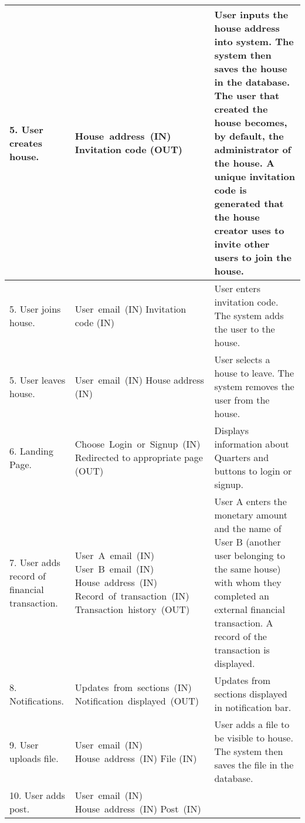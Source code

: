 \documentclass[12pt]{article}
\begin{document}
\begin{longtable}{|p{5cm}|p{5cm}|p{5cm}|}
\hline
5. User creates house. & \mbox{House address (IN)} \linebreak Invitation code (OUT) & User 
inputs the house address into system. The system then saves the house in the 
database. The user that created the house becomes, by default, the administrator of the house. A unique invitation code is generated that the house creator uses to invite other users to join the house. \\
\hline
5. User joins house. & \mbox{User email (IN)} \linebreak Invitation code (IN) & User 
enters invitation code. The system adds the user to the house. \\
\hline
5. User leaves house. & \mbox{User email (IN)} \linebreak House address (IN) & User 
selects a house to leave. The system removes the user from the house. \\
\hline
6. Landing Page. & \mbox{Choose Login or Signup (IN)} \linebreak Redirected to appropriate page (OUT) & Displays information about Quarters and buttons to login or signup. \\
\hline
7. User adds record of financial transaction. & \mbox{User A email (IN)} \linebreak \mbox{User B email (IN)} \linebreak \mbox{House address (IN)} \linebreak \mbox{Record of transaction (IN)} \linebreak \mbox{Transaction history (OUT)} & User A enters the monetary amount and the name of User B (another user belonging to the same house) with whom they completed an external financial transaction. A record of the transaction is 
displayed. \\
\hline
8. Notifications. & \mbox{Updates from  sections (IN)} \linebreak \mbox{Notification displayed (OUT)} & Updates from sections displayed in notification bar. \\
\hline
9. User uploads file. & \mbox{User email (IN)} \linebreak \mbox{House address (IN)} \linebreak File (IN) & User adds a 
file to be visible to house. The system then saves the file in the database. \\
\hline
10. User adds post. & \mbox{User email (IN)} \linebreak \mbox{House address (IN)} \linebreak\mbox{Post (IN)} \linebreak 

\end{longtable}
\end{document}
